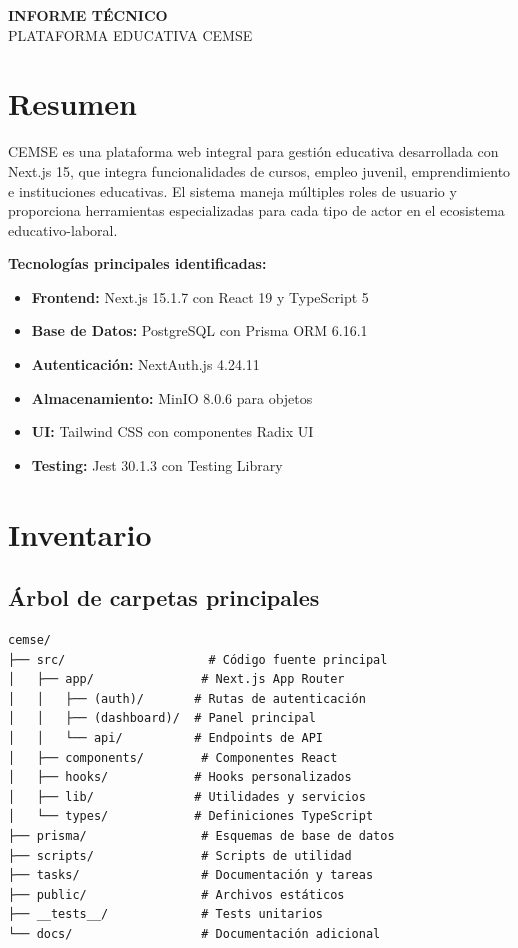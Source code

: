\documentclass[12pt,a4paper]{article}
\begin{document}
\begin{titlepage}
    \centering
    \vspace*{4cm}

    {\Huge\bfseries INFORME TÉCNICO\\[0.5cm]}
    {\LARGE PLATAFORMA EDUCATIVA CEMSE}

    \vfill

\end{titlepage}

\newpage

\section{Resumen}

CEMSE es una plataforma web integral para gestión educativa desarrollada con Next.js 15, que integra funcionalidades de cursos, empleo juvenil, emprendimiento e instituciones educativas. El sistema maneja múltiples roles de usuario y proporciona herramientas especializadas para cada tipo de actor en el ecosistema educativo-laboral.

\textbf{Tecnologías principales identificadas:}
\begin{itemize}
    \item \textbf{Frontend:} Next.js 15.1.7 con React 19 y TypeScript 5
    \item \textbf{Base de Datos:} PostgreSQL con Prisma ORM 6.16.1
    \item \textbf{Autenticación:} NextAuth.js 4.24.11
    \item \textbf{Almacenamiento:} MinIO 8.0.6 para objetos
    \item \textbf{UI:} Tailwind CSS con componentes Radix UI
    \item \textbf{Testing:} Jest 30.1.3 con Testing Library
\end{itemize}

\section{Inventario}

\subsection{Árbol de carpetas principales}

\begin{verbatim}
cemse/
├── src/                    # Código fuente principal
│   ├── app/               # Next.js App Router
│   │   ├── (auth)/       # Rutas de autenticación
│   │   ├── (dashboard)/  # Panel principal
│   │   └── api/          # Endpoints de API
│   ├── components/        # Componentes React
│   ├── hooks/            # Hooks personalizados
│   ├── lib/              # Utilidades y servicios
│   └── types/            # Definiciones TypeScript
├── prisma/                # Esquemas de base de datos
├── scripts/               # Scripts de utilidad
├── tasks/                 # Documentación y tareas
├── public/                # Archivos estáticos
├── __tests__/             # Tests unitarios
└── docs/                  # Documentación adicional
\end{verbatim}
\end{document}
